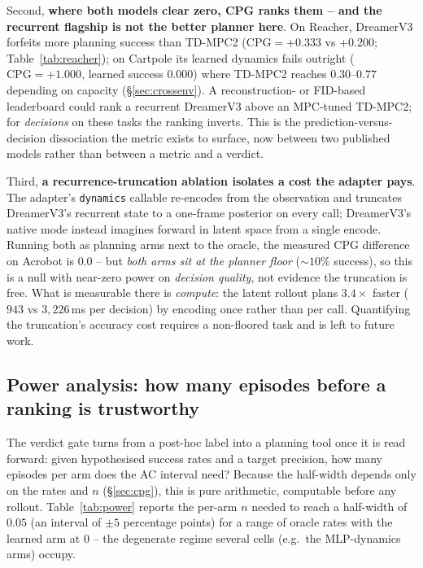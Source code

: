\documentclass[10pt,letterpaper]{article}
\begin{document}
Second, \textbf{where both models clear zero, CPG ranks them -- and the recurrent flagship is not the better planner here}. On Reacher, DreamerV3 forfeits more planning success than TD-MPC2 ($\mathrm{CPG} = +0.333$ vs $+0.200$; Table~\ref{tab:reacher}); on Cartpole its learned dynamics fails outright ($\mathrm{CPG} = +1.000$, learned success $0.000$) where TD-MPC2 reaches $0.30$--$0.77$ depending on capacity (\S\ref{sec:crossenv}). A reconstruction- or FID-based leaderboard could rank a recurrent DreamerV3 above an MPC-tuned TD-MPC2; for \emph{decisions} on these tasks the ranking inverts. This is the prediction-versus-decision dissociation the metric exists to surface, now between two published models rather than between a metric and a verdict.

Third, \textbf{a recurrence-truncation ablation isolates a cost the adapter pays}. The adapter's \texttt{dynamics} callable re-encodes from the observation and truncates DreamerV3's recurrent state to a one-frame posterior on every call; DreamerV3's native mode instead imagines forward in latent space from a single encode. Running both as planning arms next to the oracle, the measured CPG difference on Acrobot is $0.0$ -- but \emph{both arms sit at the planner floor} ($\sim\!10\%$ success), so this is a null with near-zero power on \emph{decision quality}, not evidence the truncation is free. What is measurable there is \emph{compute}: the latent rollout plans $3.4\times$ faster ($943$ vs $3{,}226$\,ms per decision) by encoding once rather than per call. Quantifying the truncation's accuracy cost requires a non-floored task and is left to future work.

\subsection{Power analysis: how many episodes before a ranking is trustworthy}
\label{sec:power}

The verdict gate turns from a post-hoc label into a planning tool once it is read forward: given hypothesised success rates and a target precision, how many episodes per arm does the AC interval need? Because the half-width depends only on the rates and $n$ (\S\ref{sec:cpg}), this is pure arithmetic, computable before any rollout. Table~\ref{tab:power} reports the per-arm $n$ needed to reach a half-width of $0.05$ (an interval of $\pm 5$ percentage points) for a range of oracle rates with the learned arm at $0$ -- the degenerate regime several cells (e.g.\ the MLP-dynamics arms) occupy.
\end{document}

